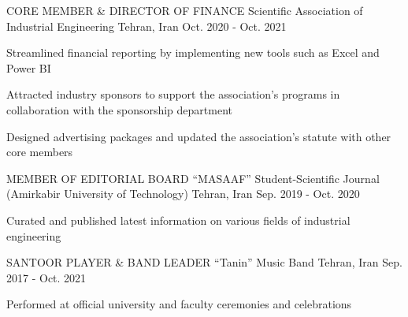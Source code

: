 

\begin{cventries}

  \cventry
    {CORE MEMBER \& DIRECTOR OF FINANCE} %
    {Scientific Association of Industrial Engineering} %
    {Tehran, Iran} %
    {Oct. 2020 - Oct. 2021} %
    {
      \begin{cvitems} %
        \item {Streamlined financial reporting by implementing new tools such as Excel and Power BI}
        \item {Attracted industry sponsors to support the association's programs in collaboration with the sponsorship department}
        \item {Designed advertising packages and updated the association's statute with other core members}
      \end{cvitems}
    }

  \cventry
    {MEMBER OF EDITORIAL BOARD} %
    {``MASAAF'' Student-Scientific Journal (Amirkabir University of Technology)} %
    {Tehran, Iran} %
    {Sep. 2019 - Oct. 2020} %
    {
      \begin{cvitems} %
    \item{Curated and published latest information on various fields of industrial engineering}
      \end{cvitems}
    }

  \cventry
    {SANTOOR PLAYER \& BAND LEADER} %
    {``Tanin'' Music Band} %
    {Tehran, Iran} %
    {Sep. 2017 - Oct. 2021} %
    {
      \begin{cvitems} %
        \item {Performed at official university and faculty ceremonies and celebrations}
      \end{cvitems}
    }
    
\end{cventries}
